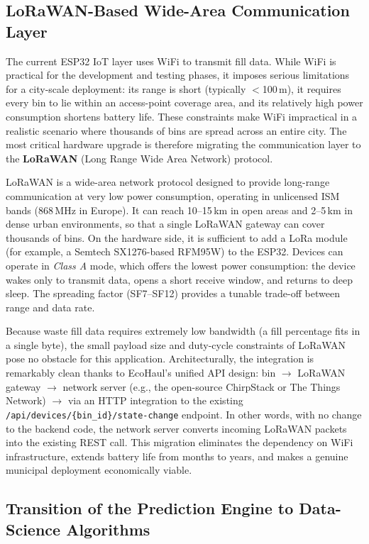 \documentclass[12pt,a4paper]{report}
\begin{document}
\begin{itemize}[leftmargin=*]
\subsection{LoRaWAN-Based Wide-Area Communication Layer}

\indent The current ESP32 IoT layer uses WiFi to transmit fill data. While WiFi is practical for the development and testing phases, it imposes serious limitations for a city-scale deployment: its range is short (typically $<$100\,m), it requires every bin to lie within an access-point coverage area, and its relatively high power consumption shortens battery life. These constraints make WiFi impractical in a realistic scenario where thousands of bins are spread across an entire city. The most critical hardware upgrade is therefore migrating the communication layer to the \textbf{LoRaWAN} (Long Range Wide Area Network) protocol.

\indent LoRaWAN is a wide-area network protocol designed to provide long-range communication at very low power consumption, operating in unlicensed ISM bands (868\,MHz in Europe). It can reach 10--15\,km in open areas and 2--5\,km in dense urban environments, so that a single LoRaWAN gateway can cover thousands of bins. On the hardware side, it is sufficient to add a LoRa module (for example, a Semtech SX1276-based RFM95W) to the ESP32. Devices can operate in \textit{Class A} mode, which offers the lowest power consumption: the device wakes only to transmit data, opens a short receive window, and returns to deep sleep. The spreading factor (SF7--SF12) provides a tunable trade-off between range and data rate.

\indent Because waste fill data requires extremely low bandwidth (a fill percentage fits in a single byte), the small payload size and duty-cycle constraints of LoRaWAN pose no obstacle for this application. Architecturally, the integration is remarkably clean thanks to EcoHaul's unified API design: bin $\rightarrow$ LoRaWAN gateway $\rightarrow$ network server (e.g., the open-source ChirpStack or The Things Network) $\rightarrow$ via an HTTP integration to the existing \texttt{/api/devices/\{bin\_id\}/state-change} endpoint. In other words, with no change to the backend code, the network server converts incoming LoRaWAN packets into the existing REST call. This migration eliminates the dependency on WiFi infrastructure, extends battery life from months to years, and makes a genuine municipal deployment economically viable.

\subsection{Transition of the Prediction Engine to Data-Science Algorithms}


\end{itemize}
\end{document}
